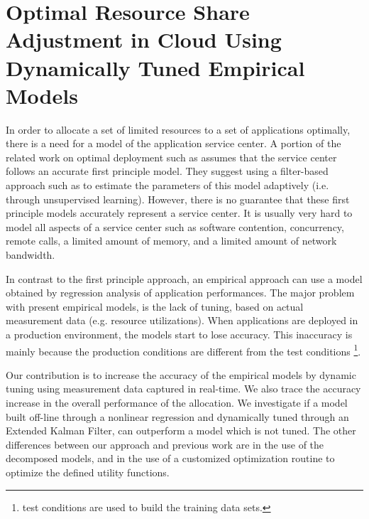 


\chapter{Optimal Resource Share Adjustment in Cloud Using Dynamically Tuned Empirical Models} 
\label{ch:optimal_tuning_of_application_resource_shares} 

In order to allocate a set of limited resources to a set of applications optimally, there is a need for a model of the application service center. 
A portion of the related work on optimal deployment such as \cite{li_fast_2009,li_performance_2009} assumes that the service center follows an accurate first principle model. They suggest using a filter-based approach such as \cite{zheng-integrated-2011} to estimate the parameters of this model adaptively (i.e. through unsupervised learning).   
However, there is no guarantee that these first principle models accurately represent a service center. It is usually very hard to model all aspects of a service center such as software contention, concurrency, remote calls, a limited amount of memory, and a limited amount of network bandwidth.  

In contrast to the first principle approach, an empirical approach can use a model obtained by regression analysis of application performances. The major problem with present empirical models, is the lack of tuning, based on actual measurement data (e.g. resource utilizations).  
When applications are deployed in a production environment, the models start to lose accuracy. This inaccuracy is mainly because the production conditions are different from the test conditions \footnote{test conditions are used to build the training data sets.}.
 
Our contribution is to increase the accuracy of the empirical models by dynamic tuning using measurement data captured in real-time. We also trace the accuracy increase in the overall performance of the allocation. We investigate if a model built off-line through a nonlinear regression and dynamically tuned through an Extended Kalman Filter, can outperform a model which is not tuned. The other differences between our approach and previous work are in the use of the decomposed models, and in the use of a customized optimization routine to optimize the defined utility functions.   

